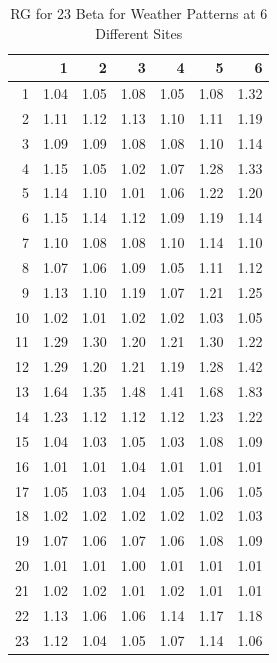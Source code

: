\documentclass[12pt]{article}
\begin{document}
\begin{table}[ht]\caption{RG for 23 Beta for Weather Patterns at 6 Different Sites}
\centering
\begin{tabular}{rrrrrrr}
  \hline
 & 1 & 2 & 3 & 4 & 5 & 6 \\ 
  \hline
1 & 1.04 & 1.05 & 1.08 & 1.05 & 1.08 & 1.32 \\ 
  2 & 1.11 & 1.12 & 1.13 & 1.10 & 1.11 & 1.19 \\ 
  3 & 1.09 & 1.09 & 1.08 & 1.08 & 1.10 & 1.14 \\ 
  4 & 1.15 & 1.05 & 1.02 & 1.07 & 1.28 & 1.33 \\ 
  5 & 1.14 & 1.10 & 1.01 & 1.06 & 1.22 & 1.20 \\ 
  6 & 1.15 & 1.14 & 1.12 & 1.09 & 1.19 & 1.14 \\ 
  7 & 1.10 & 1.08 & 1.08 & 1.10 & 1.14 & 1.10 \\ 
  8 & 1.07 & 1.06 & 1.09 & 1.05 & 1.11 & 1.12 \\ 
  9 & 1.13 & 1.10 & 1.19 & 1.07 & 1.21 & 1.25 \\ 
  10 & 1.02 & 1.01 & 1.02 & 1.02 & 1.03 & 1.05 \\ 
  11 & 1.29 & 1.30 & 1.20 & 1.21 & 1.30 & 1.22 \\ 
  12 & 1.29 & 1.20 & 1.21 & 1.19 & 1.28 & 1.42 \\ 
  13 & 1.64 & 1.35 & 1.48 & 1.41 & 1.68 & 1.83 \\ 
  14 & 1.23 & 1.12 & 1.12 & 1.12 & 1.23 & 1.22 \\ 
  15 & 1.04 & 1.03 & 1.05 & 1.03 & 1.08 & 1.09 \\ 
  16 & 1.01 & 1.01 & 1.04 & 1.01 & 1.01 & 1.01 \\ 
  17 & 1.05 & 1.03 & 1.04 & 1.05 & 1.06 & 1.05 \\ 
  18 & 1.02 & 1.02 & 1.02 & 1.02 & 1.02 & 1.03 \\ 
  19 & 1.07 & 1.06 & 1.07 & 1.06 & 1.08 & 1.09 \\ 
  20 & 1.01 & 1.01 & 1.00 & 1.01 & 1.01 & 1.01 \\ 
  21 & 1.02 & 1.02 & 1.01 & 1.02 & 1.01 & 1.01 \\ 
  22 & 1.13 & 1.06 & 1.06 & 1.14 & 1.17 & 1.18 \\ 
  23 & 1.12 & 1.04 & 1.05 & 1.07 & 1.14 & 1.06 \\ 
   \hline
\end{tabular}
\end{table}
\end{document}
